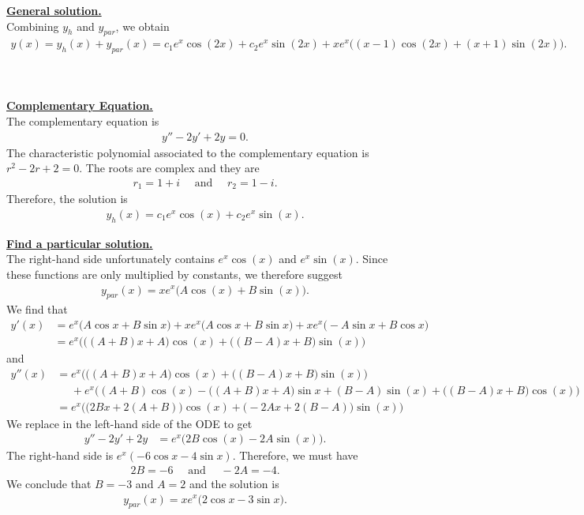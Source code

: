 \documentclass[12pt]{article}
\newcommand{\exo}[3]{\noindent\textcolor{red}{\fbox{\textbf{Section {#1} | Problem {#2} | {#3} points}}}\\}
\begin{document}
	\underline{\textbf{General solution.}}\\
	Combining $y_h$ and $y_{par}$, we obtain
		\begin{align*}
		y(x) = y_h (x) + y_{par} (x) = c_1 e^x \cos (2x) + c_2 e^x \sin (2x) + xe^x \big( (x - 1) \cos (2x) + (x + 1) \sin (2x) \big).
		\end{align*}
		
	\newpage
	
	\exo{5.5}{23}{15}
	\\
	\underline{\textbf{Complementary Equation.}}\\
	The complementary equation is
		\begin{align*}
		y'' -2y' + 2y = 0 .
		\end{align*}
	The characteristic polynomial associated to the complementary equation is $r^2 - 2r + 2 = 0$. The roots are complex and they are
		\begin{align*}
		r_1 = 1 + i \quad \text{ and } \quad r_2 = 1 - i .
		\end{align*} 
	Therefore, the solution is
		\begin{align*}
		y_h (x) = c_1 e^x \cos (x) + c_2 e^x \sin (x) .
		\end{align*}
		
	\underline{\textbf{Find a particular solution.}}\\
	The right-hand side unfortunately contains $e^x \cos (x)$ and $e^x \sin (x)$. Since these functions are only multiplied by constants, we therefore suggest 
		\begin{align*}
		y_{par} (x) = xe^x \big( A \cos (x) + B \sin (x) \big) .
		\end{align*}
	We find that
		\begin{align*}
		y' (x) &= e^x \big( A \cos x + B \sin x \big) + xe^x \big( A \cos x + B \sin x \big) + xe^x \big( -A \sin x + B \cos x \big) \\
		&= e^x \Big( \big( (A + B)x + A \big) \cos (x) + \big( (B-A)x + B \big) \sin (x) \Big)
		\end{align*}
	and
		\begin{align*}
		y'' (x) &= e^x \Big( \big( (A + B)x + A \big) \cos (x) + \big( (B-A)x + B \big) \sin (x) \Big) \\
		& \phantom{=} + e^x \Big( (A + B) \cos (x) - \big( (A + B) x + A \big) \sin x + (B - A) \sin (x) + \big( (B-A)x + B \big) \cos (x) \Big) \\
		&= e^x \Big( \big( 2Bx + 2(A + B) \big) \cos (x) + \big( -2A x + 2 (B - A) \big) \sin (x) \Big) 
		\end{align*}
	We replace in the left-hand side of the ODE to get
		\begin{align*}
		y'' - 2y' + 2y &= e^x \Big( 2B \cos (x) - 2A \sin (x) \Big) .
		\end{align*}
	The right-hand side is $e^x (-6\cos x - 4 \sin x )$. Therefore, we must have
		\begin{align*}
		2B = -6 \quad \text{ and } \quad -2A = -4 .
		\end{align*}
	We conclude that $B = -3$ and $A = 2$ and the solution is
		\begin{align*}
		y_{par} (x) = xe^x \big( 2 \cos x - 3 \sin x \big) .
		\end{align*}
	
\end{document}
